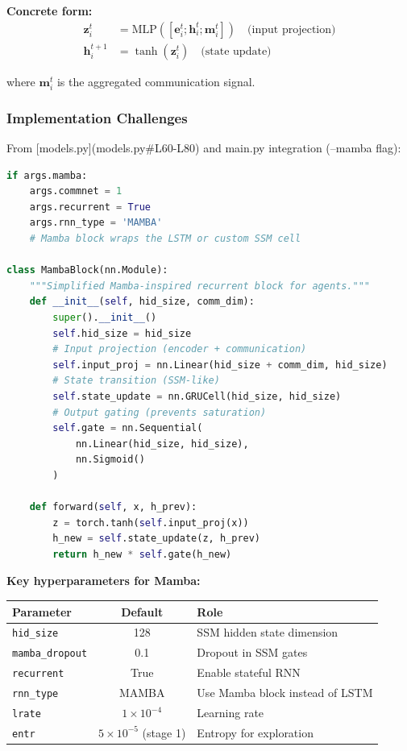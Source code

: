 \textbf{Concrete form:}
\begin{align}
\mathbf{z}_i^t &= \text{MLP}([\mathbf{e}_i^t; \mathbf{h}_i^t; \mathbf{m}_i^t]) \quad \text{(input projection)} \\
\mathbf{h}_i^{t+1} &= \tanh(\mathbf{z}_i^t) \quad \text{(state update)}
\end{align}

where $\mathbf{m}_i^t$ is the aggregated communication signal.

\subsubsection{Implementation Challenges}

From [models.py](models.py#L60-L80) and main.py integration (--mamba flag):

\begin{lstlisting}[language=Python, basicstyle=\small]
if args.mamba:
    args.commnet = 1
    args.recurrent = True
    args.rnn_type = 'MAMBA'
    # Mamba block wraps the LSTM or custom SSM cell

class MambaBlock(nn.Module):
    """Simplified Mamba-inspired recurrent block for agents."""
    def __init__(self, hid_size, comm_dim):
        super().__init__()
        self.hid_size = hid_size
        # Input projection (encoder + communication)
        self.input_proj = nn.Linear(hid_size + comm_dim, hid_size)
        # State transition (SSM-like)
        self.state_update = nn.GRUCell(hid_size, hid_size)
        # Output gating (prevents saturation)
        self.gate = nn.Sequential(
            nn.Linear(hid_size, hid_size),
            nn.Sigmoid()
        )
    
    def forward(self, x, h_prev):
        z = torch.tanh(self.input_proj(x))
        h_new = self.state_update(z, h_prev)
        return h_new * self.gate(h_new)
\end{lstlisting}

\textbf{Key hyperparameters for Mamba:}
\begin{table}[h]
\centering
\begin{tabular}{|l|c|l|}
\hline
\textbf{Parameter} & \textbf{Default} & \textbf{Role} \\
\hline
\texttt{hid\_size} & 128 & SSM hidden state dimension \\
\texttt{mamba\_dropout} & 0.1 & Dropout in SSM gates \\
\texttt{recurrent} & True & Enable stateful RNN \\
\texttt{rnn\_type} & MAMBA & Use Mamba block instead of LSTM \\
\texttt{lrate} & $1 \times 10^{-4}$ & Learning rate \\
\texttt{entr} & $5 \times 10^{-5}$ (stage 1) & Entropy for exploration \\
\hline
\end{tabular}
\end{table}

